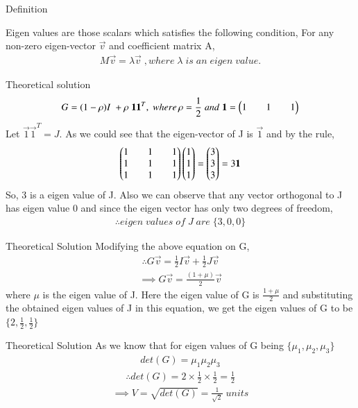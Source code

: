 \documentclass{beamer}
\begin{document}
\begin{frame}{Definition}

Eigen values are those scalars which satisfies the following condition,
For any non-zero eigen-vector $\vec{v}$ and coefficient matrix A,
\begin{align*}
    M\vec{v}=\lambda \vec{v} \; , where \; \lambda \;is\; an \;eigen\; value.
\end{align*}
\end{frame}

\begin{frame}{Theoretical solution}
\begin{align*}
     G=(1-\rho)I\;+\rho\;\mathbf{1}\mathbf{1}^T, \; where\, \rho=\frac{1}{2}\;and\;\mathbf{1}=\begin{pmatrix}1&&1&&1\end{pmatrix}
\end{align*}
Let $\vec{1}\vec{1}^T=J$. As we could see that the eigen-vector of J is $\vec{1}$ and by the rule,
\begin{align*}
    \begin{pmatrix}1&&1&&1\\1&&1&&1\\1&&1&&1\end{pmatrix}\begin{pmatrix}1\\1\\1\end{pmatrix}=\begin{pmatrix}3\\3\\3\end{pmatrix}=3\mathbf{1}
\end{align*}
So, 3 is a eigen value of J. Also we can observe that any vector orthogonal to J has eigen value 0 and since the eigen vector has only two degrees of freedom,
\begin{align*}
    \therefore eigen\;values\;of\;J\;are\;\{3,0,0\}
\end{align*}
\end{frame}

\begin{frame}{Theoretical Solution}
Modifying the above equation on G,
\begin{align*}
    \therefore G\vec{v}=\frac{1}{2}I\vec{v}+\frac{1}{2}J\vec{v}
\end{align*}
\begin{align*}
    \implies G\vec{v}=\frac{(1+\mu)}{2}\vec{v}
\end{align*}
where $\mu$ is the eigen value of J. Here the eigen value of G is $\frac{1+\mu}{2}$ and substituting the obtained eigen values of J in this equation, we get the eigen values of G to be $\{2,\frac{1}{2},\frac{1}{2}\}$
\end{frame}

\begin{frame}{Theoretical Solution}
As we know that for eigen values of G being $\{\mu_1,\mu_2,\mu_3\}$
\begin{align*}
    det(G)=\mu_1\mu_2\mu_3
\end{align*}
\begin{align*}
    \therefore det(G)=2\times\frac{1}{2}\times\frac{1}{2}=\frac{1}{2}
\end{align*}
\begin{align*}
    \implies V=\sqrt{det(G)}=\frac{1}{\sqrt{2}} \; units
\end{align*}
\end{frame}
\end{document}
